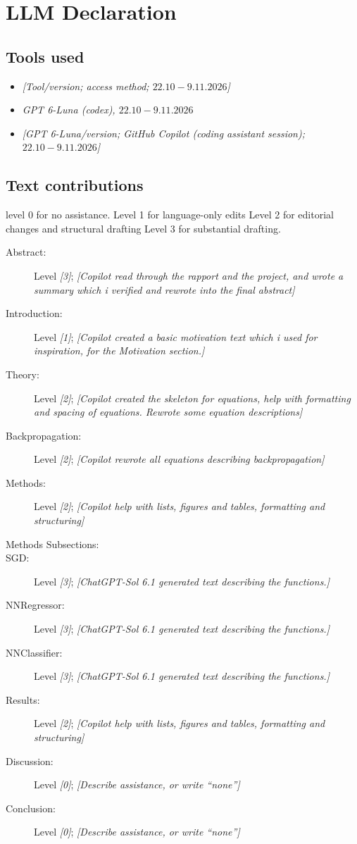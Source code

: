 \appendix
\section{LLM Declaration}

\subsection{Tools used}

\begin{itemize}
    \item \textit{[Tool/version; access method; $22.10-9.11.2026$]}
    \item \textit{GPT 6-Luna (codex), $22.10-9.11.2026$}
    \item \textit{[GPT 6-Luna/version; GitHub Copilot (coding assistant session); $22.10-9.11.2026$]}
\end{itemize}
\subsection{Text contributions}

level 0 for no assistance.  
Level 1 for language-only edits
Level 2 for editorial changes and structural drafting
Level 3 for substantial drafting. 

\begin{description}
    \item[Abstract:] Level \textit{[3]}; \textit{[Copilot read through the rapport and the project, and wrote a summary which i verified and rewrote into the final abstract]}
    \item[Introduction:] Level \textit{[1]}; \textit{[Copilot created a basic motivation text which i used for inspiration, for the Motivation section.]}
    \item[Theory:] Level \textit{[2]}; \textit{[Copilot created the skeleton for equations, help with formatting and spacing of equations. Rewrote some equation descriptions]}
    \item[Backpropagation:] Level \textit{[2]}; \textit{[Copilot rewrote all equations describing backpropagation]}
    \item[Methods:] Level \textit{[2]}; \textit{[Copilot help with lists, figures and tables, formatting and structuring]}
    \item[Methods Subsections:] 
    \item[SGD:] Level \textit{[3]}; \textit{[ChatGPT-Sol 6.1 generated text describing the functions.]}
    \item[NNRegressor:] Level \textit{[3]}; \textit{[ChatGPT-Sol 6.1 generated text describing the functions.]} 
    \item[NNClassifier:] Level \textit{[3]}; \textit{[ChatGPT-Sol 6.1 generated text describing the functions.]}
    \item[Results:] Level \textit{[2]}; \textit{[Copilot help with lists, figures and tables, formatting and structuring]}
    \item[Discussion:] Level \textit{[0]}; \textit{[Describe assistance, or write ``none'']}
    \item[Conclusion:] Level \textit{[0]}; \textit{[Describe assistance, or write ``none'']}
\end{description}


